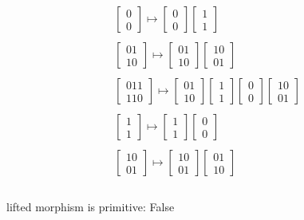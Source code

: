 $$\begin{array}{l}\begin{bmatrix}0\\ 0\end{bmatrix} \mapsto \begin{bmatrix}0\\ 0\end{bmatrix} \begin{bmatrix}1\\ 1\end{bmatrix}\\\\ \begin{bmatrix}01\\ 10\end{bmatrix} \mapsto \begin{bmatrix}01\\ 10\end{bmatrix} \begin{bmatrix}10\\ 01\end{bmatrix}\\\\ \begin{bmatrix}011\\ 110\end{bmatrix} \mapsto \begin{bmatrix}01\\ 10\end{bmatrix} \begin{bmatrix}1\\ 1\end{bmatrix} \begin{bmatrix}0\\ 0\end{bmatrix} \begin{bmatrix}10\\ 01\end{bmatrix}\\\\ \begin{bmatrix}1\\ 1\end{bmatrix} \mapsto \begin{bmatrix}1\\ 1\end{bmatrix} \begin{bmatrix}0\\ 0\end{bmatrix}\\\\ \begin{bmatrix}10\\ 01\end{bmatrix} \mapsto \begin{bmatrix}10\\ 01\end{bmatrix} \begin{bmatrix}01\\ 10\end{bmatrix}\\\end{array}$$ \\
lifted morphism is primitive: False \\
\noindent\makebox[\linewidth]{\rule{\paperwidth}{0.4pt}}

